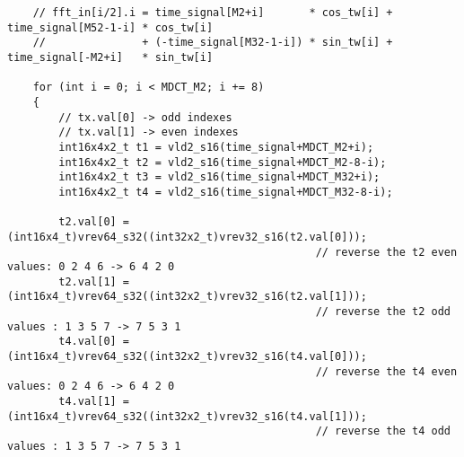 \documentclass{article}
\begin{document}
\begin{lstlisting}
    // fft_in[i/2].i = time_signal[M2+i]       * cos_tw[i] + time_signal[M52-1-i] * cos_tw[i]
    //               + (-time_signal[M32-1-i]) * sin_tw[i] + time_signal[-M2+i]   * sin_tw[i]

    for (int i = 0; i < MDCT_M2; i += 8)
    {
        // tx.val[0] -> odd indexes
        // tx.val[1] -> even indexes
        int16x4x2_t t1 = vld2_s16(time_signal+MDCT_M2+i);
        int16x4x2_t t2 = vld2_s16(time_signal+MDCT_M2-8-i);
        int16x4x2_t t3 = vld2_s16(time_signal+MDCT_M32+i);
        int16x4x2_t t4 = vld2_s16(time_signal+MDCT_M32-8-i);

        t2.val[0] = (int16x4_t)vrev64_s32((int32x2_t)vrev32_s16(t2.val[0]));
                                                // reverse the t2 even values: 0 2 4 6 -> 6 4 2 0
        t2.val[1] = (int16x4_t)vrev64_s32((int32x2_t)vrev32_s16(t2.val[1]));
                                                // reverse the t2 odd values : 1 3 5 7 -> 7 5 3 1
        t4.val[0] = (int16x4_t)vrev64_s32((int32x2_t)vrev32_s16(t4.val[0]));
                                                // reverse the t4 even values: 0 2 4 6 -> 6 4 2 0
        t4.val[1] = (int16x4_t)vrev64_s32((int32x2_t)vrev32_s16(t4.val[1]));
                                                // reverse the t4 odd values : 1 3 5 7 -> 7 5 3 1
\end{lstlisting}
\end{document}

